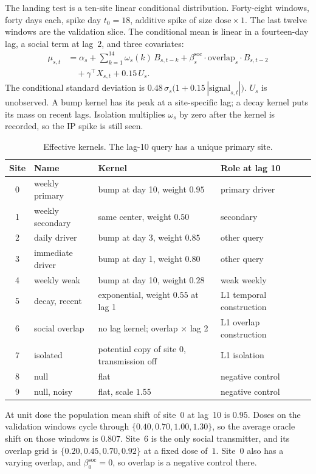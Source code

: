 \documentclass[11pt]{article}
\begin{document}
The landing test is a ten-site linear conditional distribution.
Forty-eight windows, forty days each, spike day $t_0=18$, additive spike of size $\mathrm{dose}\times 1$.
The last twelve windows are the validation slice.
The conditional mean is linear in a fourteen-day lag, a social term at lag~$2$, and three covariates:
\begin{align}
\label{eq:mu}
\mu_{s,t}
&=
\alpha_s
+\sum_{k=1}^{14}\omega_s(k)\,B_{s,t-k}
+\beta^{\mathrm{soc}}_s\cdot\mathrm{overlap}_{s}\cdot B_{s,t-2} \nonumber\\
&\quad
+\gamma^\top X_{s,t}
+0.15\,U_s .
\end{align}
The conditional standard deviation is $0.48\,\sigma_s\bigl(1+0.15\,|\mathrm{signal}_{s,t}|\bigr)$.
$U_s$ is unobserved.
A bump kernel has its peak at a site-specific lag; a decay kernel puts its mass on recent lags.
Isolation multiplies $\omega_s$ by zero after the kernel is recorded, so the IP spike is still seen.

\begin{table}[t]
\centering
\caption{Effective kernels. The lag-10 query has a unique primary site.}
\label{tab:sites}
\begin{tabular}{@{}clllc@{}}
\toprule
Site & Name & Kernel & Role at lag 10 \\
\midrule
0 & weekly primary & bump at day 10, weight $0.95$ & primary driver \\
1 & weekly secondary & same center, weight $0.50$ & secondary \\
2 & daily driver & bump at day 3, weight $0.85$ & other query \\
3 & immediate driver & bump at day 1, weight $0.80$ & other query \\
4 & weekly weak & bump at day 10, weight $0.28$ & weak weekly \\
5 & decay, recent & exponential, weight $0.55$ at lag 1 & L1 temporal construction \\
6 & social overlap & no lag kernel; overlap $\times$ lag 2 & L1 overlap construction \\
7 & isolated & potential copy of site 0, transmission off & L1 isolation \\
8 & null & flat & negative control \\
9 & null, noisy & flat, scale $1.55$ & negative control \\
\bottomrule
\end{tabular}
\end{table}

At unit dose the population mean shift of site~0 at lag~10 is $0.95$.
Doses on the validation windows cycle through $\{0.40,0.70,1.00,1.30\}$, so the average oracle shift on those windows is $0.807$.
Site~6 is the only social transmitter, and its overlap grid is $\{0.20,0.45,0.70,0.92\}$ at a fixed dose of~$1$.
Site~0 also has a varying overlap, and $\beta^{\mathrm{soc}}_0=0$, so overlap is a negative control there.
\end{document}
